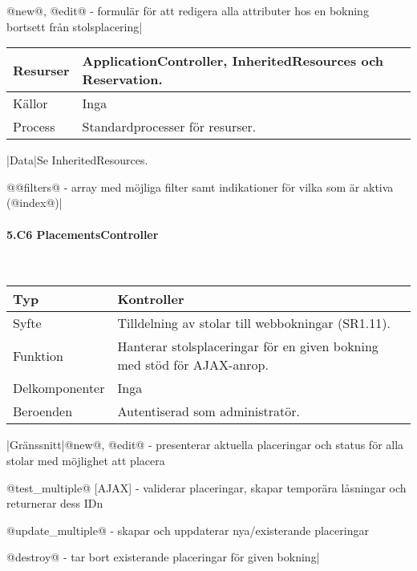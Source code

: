 \documentclass[a4paper, twoside, 11pt, titlepage]{article}
\begin{document}
			@new@, @edit@ - formulär för att redigera alla attributer hos en bokning bortsett från stolsplacering|

			\begin {table} [ht] \begin{tabular} {  p{3.5cm} p{9.6cm} }
				\hline
				Resurser & ApplicationController, InheritedResources och Reservation.  \\
				\hline
				Källor & Inga  \\
				\hline
				Process & Standardprocesser för resurser.  \\
				\hline
			\end{tabular} \end{table} \FloatBarrier
			\vspace{6mm}

			|Data|Se InheritedResources.

			@@filters@ - array med möjliga filter samt indikationer för vilka som är aktiva (@index@)|

			\paragraph{5.C6 PlacementsController}\

			\begin {table} [ht] \begin{tabular} {  p{3.5cm} p{9.6cm} }
				\hline
				Typ & Kontroller  \\
				\hline
				Syfte & Tilldelning av stolar till webbokningar (SR1.11).  \\
				\hline
				Funktion & Hanterar stolsplaceringar för en given bokning med stöd för AJAX-anrop.  \\
				\hline
				Delkomponenter & Inga  \\
				\hline
				Beroenden & Autentiserad som administratör.  \\
				\hline
			\end{tabular} \end{table} \FloatBarrier
			\vspace{6mm}

			|Gränssnitt|@new@, @edit@ - presenterar aktuella placeringar och status för alla stolar med möjlighet att placera

			@test\_multiple@ [AJAX] - validerar placeringar, skapar temporära låsningar och returnerar dess IDn

			@update\_multiple@ - skapar och uppdaterar nya/existerande placeringar

			@destroy@ - tar bort existerande placeringar för given bokning|
\end{document}
